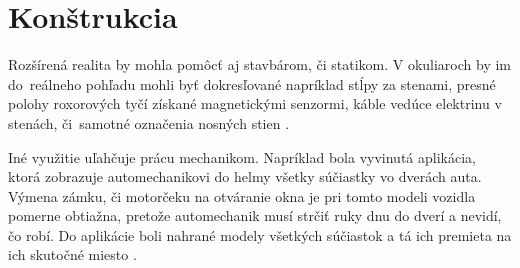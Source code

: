 \section{Konštrukcia}

Rozšírená realita by mohla pomôcť aj stavbárom, či statikom. V okuliaroch by im do~reálneho pohľadu mohli byť dokresľované napríklad stĺpy za stenami, presné polohy roxorových tyčí získané magnetickými senzormi, káble vedúce elektrinu v stenách, či~samotné označenia nosných stien \cite{Webster96}.

Iné využitie uľahčuje prácu mechanikom. Napríklad bola vyvinutá aplikácia, ktorá zobrazuje automechanikovi do helmy všetky súčiastky vo dverách auta. Výmena zámku, či motorčeku na otváranie okna je pri tomto modeli vozidla pomerne obtiažna, pretože automechanik musí strčiť ruky dnu do dverí a nevidí, čo robí. Do aplikácie boli nahrané modely všetkých súčiastok a tá ich premieta na
ich skutočné miesto \cite{Reiners98}.